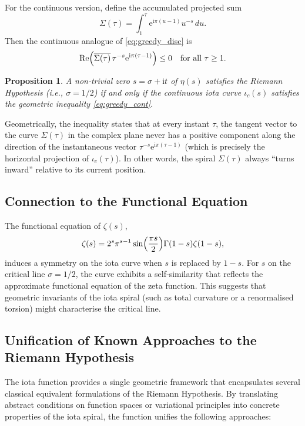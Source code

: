 \documentclass[11pt]{article}
\newtheorem{proposition}[theorem]{Proposition}
\newcommand{\iu}{\mathrm{i}} %
\newcommand{\e}{\mathrm{e}}
\DeclareMathOperator{\ReOp}{Re}
\begin{document}
For the continuous version, define the accumulated projected sum
\[
  \Sigma(\tau) = \int_1^\tau \e^{\iu\pi(u-1)} u^{-s}\,du.
\]
Then the continuous analogue of \eqref{eq:greedy_disc} is
\begin{equation}
  \ReOp\Bigl( \overline{\Sigma(\tau)}\, \tau^{-s} \e^{\iu\pi(\tau-1)} \Bigr) \le 0
  \quad \text{for all } \tau \ge 1.
  \label{eq:greedy_cont}
\end{equation}

\begin{proposition}
  A non‑trivial zero $s = \sigma + \iu t$ of $\eta(s)$ satisfies the Riemann Hypothesis (i.e., $\sigma = 1/2$) if and only if the continuous iota curve $\iota_c(s)$ satisfies the geometric inequality \eqref{eq:greedy_cont}.
\end{proposition}

Geometrically, the inequality states that at every instant $\tau$, the tangent vector to the curve $\Sigma(\tau)$ in the complex plane never has a positive component along the direction of the instantaneous vector $\tau^{-s}\e^{\iu\pi(\tau-1)}$ (which is precisely the horizontal projection of $\iota_c(\tau)$).  In other words, the spiral $\Sigma(\tau)$ always ``turns inward'' relative to its current position.

\subsection{Connection to the Functional Equation}
The functional equation of $\zeta(s)$,
\[
  \zeta(s) = 2^s \pi^{s-1} \sin\Bigl(\frac{\pi s}{2}\Bigr) \Gamma(1-s) \zeta(1-s),
\]
induces a symmetry on the iota curve when $s$ is replaced by $1-s$.  For $s$ on the critical line $\sigma = 1/2$, the curve exhibits a self‑similarity that reflects the approximate functional equation of the zeta function.  This suggests that geometric invariants of the iota spiral (such as total curvature or a renormalised torsion) might characterise the critical line.

\subsection{Unification of Known Approaches to the Riemann Hypothesis}\label{subsec:unification}

The iota function provides a single geometric framework that encapsulates several classical equivalent formulations of the Riemann Hypothesis.  By translating abstract conditions on function spaces or variational principles into concrete properties of the iota spiral, the function unifies the following approaches:
\end{document}
